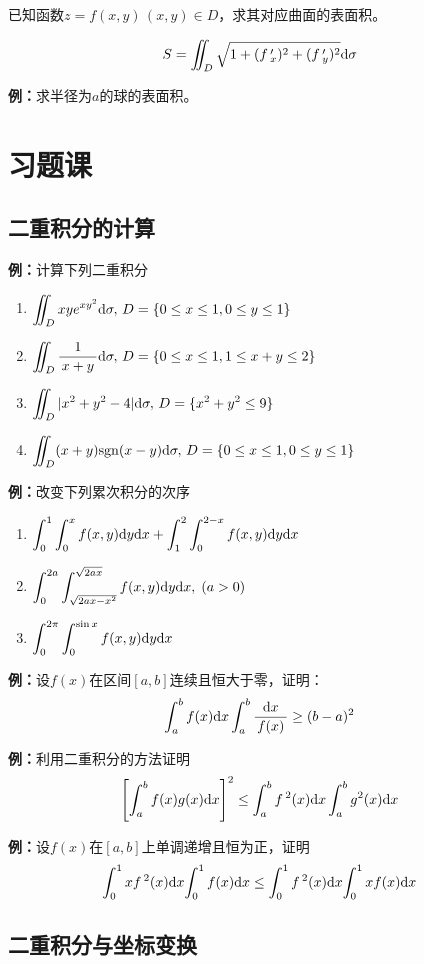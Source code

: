 已知函数$z=f(x,y)\,(x,y)\in D$，求其对应曲面的表面积。

$${S=\iint_D\sqrt{1+(f\,'_x)^2+(f\,'_y)^2}\mathrm{d}\sigma}$$

{\bf 例：}求半径为$a$的球的表面积。

\section{习题课}

\subsection{二重积分的计算}

{\bf 例：}计算下列二重积分
\begin{enumerate}[(1)]
  \setlength{\itemindent}{1cm}
  \item $\displaystyle\iint_Dxye^{xy^2}\mathrm{d}\sigma,\,D=\{0\leq x\leq 1,0\leq
  y\leq 1\}$ 
  \item $\displaystyle\iint_D\displaystyle\frac{\,{1}\,}{\,{x+y}\,}\mathrm{d}\sigma,\,D=\{0\leq x\leq 1,1\leq x+y\leq
  2\}$ 
  \item $\displaystyle\iint_D|x^2+y^2-4|\mathrm{d}\sigma,\,D=\{x^2+y^2\leq 9\}$ 
  \item $\displaystyle\iint_D(x+y)\mathrm{sgn}(x-y)\mathrm{d}\sigma,\,D=\{0\leq x\leq 1,0\leq
  y\leq 1\}$
\end{enumerate}

{\bf 例：}改变下列累次积分的次序
\begin{enumerate}[(1)]
  \setlength{\itemindent}{1cm}
  \item $\displaystyle\int_0^1\displaystyle\int_0^xf(x,y)\mathrm{d}
  y\mathrm{d} x+\displaystyle\int_1^2\displaystyle\int_0^{2-x}f(x,y)\mathrm{d} y\mathrm{d} x$
  \item $\displaystyle\int_0^{2a}\displaystyle\int_{\sqrt{2ax-x^2}}^{\sqrt{2ax}}
  f(x,y)\mathrm{d} y\mathrm{d} x,\;(a>0)$ 
  \item $\displaystyle\int_0^{2\pi}\displaystyle\int_0^{\sin x}f(x,y)\mathrm{d} y\mathrm{d} x$
\end{enumerate}

{\bf 例：}设$f(x)$在区间$[a,b]$连续且恒大于零，证明：
$$\displaystyle\int_a^bf(x)\mathrm{d} x\displaystyle\int_a^b\displaystyle\frac{\,{\mathrm{d} x}\,}{\,{f(x)}\,}\geq (b-a)^2$$

{\bf 例：}利用二重积分的方法证明
$$\left[\displaystyle\int_a^bf(x)g(x)\mathrm{d} x\right]^2\leq
\displaystyle\int_a^bf\,^2(x)\mathrm{d} x\displaystyle\int_a^bg^2(x)\mathrm{d} x$$

{\bf 例：}设$f(x)$在$[a,b]$上单调递增且恒为正，证明
$${\displaystyle\int_0^1xf\,^2(x)\mathrm{d} x}{\displaystyle\int_0^1f(x)\mathrm{d} x}\leq
{\ensuremath{\displaystyle\int}_0^1f\,^2(x)\mathrm{d}x}{\ensuremath{\displaystyle\int}_0^1xf(x)\mathrm{d}x}$$

\subsection{二重积分与坐标变换}

